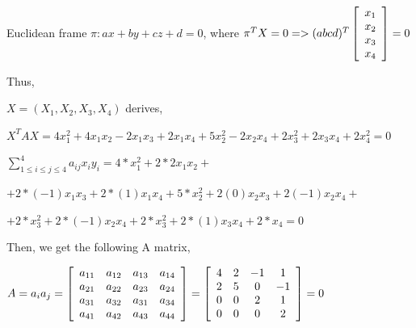 \documentclass[]{article}
\begin{document}
\centerline {
	Euclidean frame $\pi : ax + by + cz +d = 0$, where
	$\pi^TX = 0 => (a b c d) ^T\left[ {\begin{array}{*{20}c}
		x_1 \\
		x_2 \\ 
		x_3 \\
		x_4  
		\end{array} } \right] = 0$	
}

Thus, 

\centerline {
	$X = (X_1, X_2, X_3, X_4)$ derives, 
}

\vspace{0.5em}

\centerline {
		$X^TAX = 4x_1^2 + 4x_1x_2 - 2x_1x_3 + 2x_1x_4 + 5x_2^2 - 2x_2x_4 + 2x_3^2 + 2x_3x_4 + 2x_4^2 = 0$
}

\vspace{0.5em}

\centerline {
	$\sum_{1 \leq i \leq  j \leq 4 }^{4} a_{ij}x_iy_i  = 4*x_1^2 + 2*2x_1x_2 + $ 
}

\vspace{0.5em}

\centerline {
	$+ 2 * (-1)x_1x_3 + 2* (1)x_1x_4 + 5*x_2^2 + 2(0)x_2x_3 + 2(-1)x_2x_4 +$
}

\vspace{0.5em}

\centerline {
	$+  2*x_3^2 + 2*(-1)x_2x_4 + 2* x_3^2 + 2*(1)x_3x_4 + 2*x_4 = 0$
}

\vspace{0.5em}

Then, we get the following A matrix,

\vspace{0.5em}

\centerline {
	$A = a_ia_j = \left[ {\begin{array}{*{20}c}
		a_{11} & a_{12} & a_{13} & a_{14} \\
		a_{21} & a_{22} & a_{23} & a_{24} \\ 
		a_{31} & a_{32} & a_{31} &  a_{34} \\
		a_{41} & a_{42} & a_{43} & a_{44}  
		\end{array} } \right] =  \left[ {\begin{array}{*{20}c}
		4 & 2 & -1 & 1 \\
		2 & 5 & 0 & -1 \\ 
		0 & 0 & 2 &  1 \\
		0 & 0 & 0 & 2  
		\end{array} } \right] = 0 $ 
}
\end{document}

